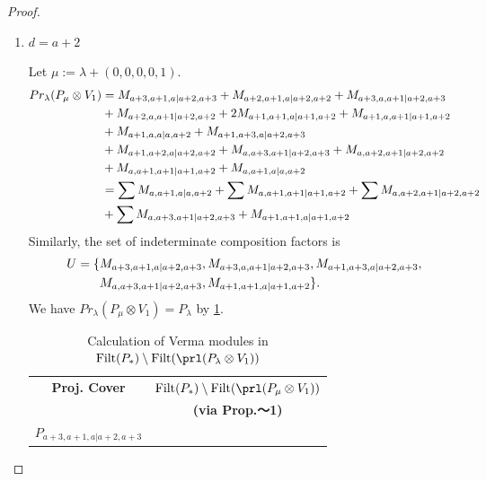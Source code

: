 \begin{proof}
\begin{enumerate}
\begin{enumerate}
\begin{enumerate}
            \item $ d = a+2 $\par
        Let $\mu:=\lambda + (0,0,0,0,1) $.
        \begin{equation}\notag
          \begin{aligned}
            Pr_{\lambda}(P_\mu \otimes V_{1}) &=
M_{a+3,a+1,a|a+2,a+3}
+ M_{a+2,a+1,a|a+2,a+2}
+ M_{a+3,a,a+1|a+2,a+3}\\
                                               &
+ M_{a+2,a,a+1|a+2,a+2}
+ 2M_{a+1,a+1,a|a+1,a+2}
+ M_{a+1,a,a+1|a+1,a+2}\\
                                               &
+ M_{a+1,a,a|a,a+2}
+ M_{a+1,a+3,a|a+2,a+3}\\
                                               &
+ M_{a+1,a+2,a|a+2,a+2}
+ M_{a,a+3,a+1|a+2,a+3}
+ M_{a,a+2,a+1|a+2,a+2}\\
                                               &
+ M_{a,a+1,a+1|a+1,a+2}
+ M_{a,a+1,a|a,a+2} \\
                                               &=
\sum M_{a,a+1,a|a,a+2}
+ \sum M_{a,a+1,a+1|a+1,a+2}
+ \sum M_{a,a+2,a+1|a+2,a+2}\\
                                               &
+ \sum M_{a,a+3,a+1|a+2,a+3}
+  M_{a+1,a+1,a|a+1,a+2}
          \end{aligned}
        \end{equation}
      Similarly, the set of indeterminate composition factors is 
\begin{equation}\notag
  \begin{aligned}
     U = \{
&M_{a+3,a+1,a|a+2,a+3},
M_{a+3,a,a+1|a+2,a+3},
M_{a+1,a+3,a|a+2,a+3}, \\
&M_{a,a+3,a+1|a+2,a+3},
M_{a+1,a+1,a|a+1,a+2}
\}.
  \end{aligned}
\end{equation}
      We have $Pr_{\lambda}(P_\mu \otimes V_{1}) = P_\lambda  $ by \cref{tab:verma-analysis_1_a_6}.
\begin{table}[htbp]
\centering
\caption{Calculation of Verma modules in $\operatorname{Filt}(P_*) \setminus \operatorname{Filt}(\prl(P_\lambda \otimes V_{1})) $ } \label{tab:verma-analysis_1_a_6}
\begin{tabular}{cc}
\toprule
\textbf{Proj. Cover} & \textbf{$\operatorname{Filt}(P_*) \setminus \operatorname{Filt}(\prl(P_\mu \otimes V_{1})) $}  \\
     & \textbf{(via Prop.～1)}  \\
\midrule
 $P_{a+3,a+1,a|a+2,a+3}$ & \makecell{
}
\end{tabular}
\end{table}
\end{enumerate}
\end{enumerate}
\end{enumerate}
\end{proof}
